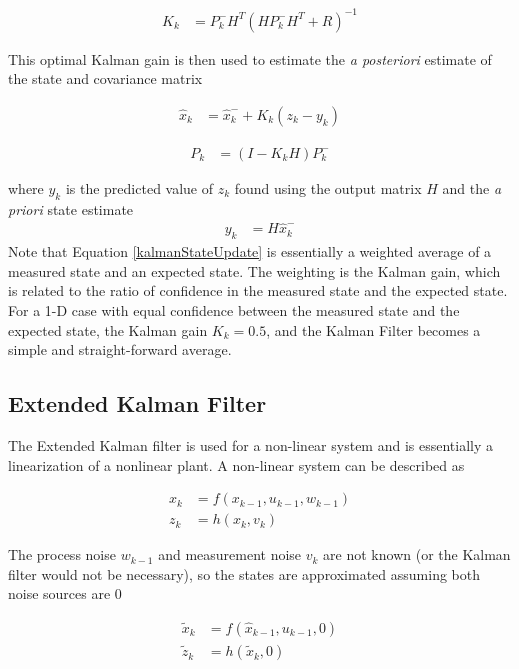 \begin{align}
K_k &=P^-_kH^T(HP^-_kH^T + R)^{-1}
\end{align}

This optimal Kalman gain is then used to estimate the \textit{a posteriori} estimate of the state and covariance matrix

\begin{align}
\label{kalmanStateUpdate}
\hat{x}_k &=\hat{x}^-_k+K_k(z_k-y_k)
\end{align}

\begin{align}
P_k &= (I-K_kH)P^-_k
\end{align}

where $y_k$ is the predicted value of $z_k$ found using the output matrix $H$ and the \textit{a priori} state estimate
\begin{align}
y_k &= H\hat{x}^-_k
\end{align}
Note that Equation \ref{kalmanStateUpdate} is essentially a weighted average of a measured state and an expected state. The weighting is the Kalman gain, which is related to the ratio of confidence in the measured state and the expected state. For a 1-D case with equal confidence between the measured state and the expected state, the Kalman gain $K_k = 0.5$, and the Kalman Filter becomes a simple and straight-forward average.


\subsection{Extended Kalman Filter}
\label{EKFTheory}
The Extended Kalman filter is used for a non-linear system and is essentially a linearization of a nonlinear plant. A non-linear system can be described as \cite{welch1995introduction}

\begin{align}
x_k &= f(x_{k-1},u_{k-1},w_{k-1})\\
z_k &= h(x_k,v_k)
\end{align}

The process noise $w_{k-1}$ and measurement noise $v_k$ are not known (or the Kalman filter would not be necessary), so the states are approximated assuming both noise sources are 0

\begin{align}
\tilde{x}_k &= f(\hat{x}_{k-1},u_{k-1},0)\\
\tilde{z}_k &= h(\tilde{x}_k,0)
\end{align}

